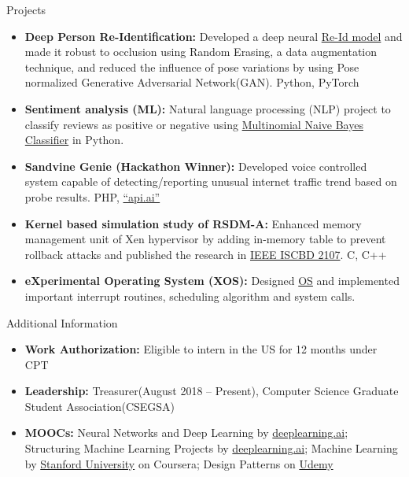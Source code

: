 \documentclass[]{mcdowellcv}
\begin{document}
	\begin{cvsection}{Projects}
		\begin{cvsubsection}{}{}{}
			\begin{itemize}
				\item \textbf{Deep Person Re-Identification:} Developed a deep neural \href{https://github.com/aditya30394/Person-Re-Identification}{Re-Id model} and made it robust to occlusion using Random Erasing, a data augmentation technique, and reduced the influence of pose variations by using Pose normalized Generative Adversarial Network(GAN).  Python, PyTorch
				\item \textbf{Sentiment analysis (ML):} Natural language processing (NLP) project to classify reviews as positive or negative using \href{https://github.com/aditya30394/Review-Classifier}{Multinomial Naive Bayes Classifier} in Python.
				\item \textbf{Sandvine Genie (Hackathon Winner):} Developed voice controlled system capable of detecting/reporting unusual internet traffic trend based on probe results.  PHP, \href{https://dialogflow.com/}{``api.ai''}
				\item \textbf{Kernel based simulation study of RSDM-A:} Enhanced memory management unit of Xen hypervisor by adding in-memory table to prevent rollback attacks and  published the research in \href{https://ieeexplore.ieee.org/document/8181523/}{IEEE ISCBD 2107}.  C, C++
				\item \textbf{eXperimental Operating System (XOS): } Designed \href{http://xosnitc.github.io/}{OS} and implemented important interrupt routines, scheduling algorithm and system calls.
			\end{itemize}
		\end{cvsubsection}
	\end{cvsection}
	
	\begin{cvsection}{Additional Information}
		\begin{cvsubsection}{}{}{}	
			\begin{itemize}
				\item \textbf{Work Authorization:} Eligible to intern in the US for 12 months under CPT
				\item \textbf{Leadership:} Treasurer(August 2018 -- Present), Computer Science Graduate Student Association(CSEGSA)
				\item \textbf{MOOCs:} Neural Networks and Deep Learning by \href{https://www.coursera.org/account/accomplishments/verify/ZYYLP6LB9HPX}{deeplearning.ai}; Structuring Machine Learning Projects by \href{https://www.coursera.org/account/accomplishments/verify/8G7XPAQQZT28}{deeplearning.ai}; Machine Learning by \href{https://www.coursera.org/account/accomplishments/verify/NQRVPNVBEN4K}{Stanford University} on Coursera; Design Patterns on \href{https://www.udemy.com/certificate/UC-DWASSJ2I/}{Udemy}
			\end{itemize}
		\end{cvsubsection}
	\end{cvsection}
	
	
	
\end{document}

